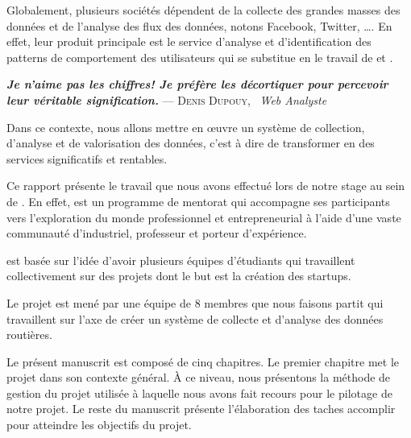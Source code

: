 Globalement, plusieurs sociétés dépendent de la collecte des grandes masses des
données et de l'analyse des flux des données, notons Facebook, Twitter, \ldots.
En effet, leur produit principale est le service d'analyse et d'identification
des patterns de comportement des utilisateurs qui se substitue en le travail de
 et .

\begin{center}
\textbf{\textit{Je n’aime pas les chiffres! Je préfère les décortiquer pour
percevoir leur véritable signification.}} \linebreak
\hfill --- \textsc{Denis Dupouy}, \ \textit{Web Analyste}
\end{center}

Dans ce contexte, nous allons mettre en \oe{}uvre un système de
collection, d'analyse et de valorisation des données, c'est à dire de transformer
en des services significatifs et rentables.

Ce rapport présente le travail que nous avons effectué lors de notre stage au
sein de . En effet,  est
un programme de mentorat qui accompagne ses participants vers l'exploration du monde
professionnel et entrepreneurial à l'aide d'une vaste communauté d'industriel,
professeur et porteur d'expérience.

 est basée sur l'idée d'avoir plusieurs équipes d'étudiants
qui travaillent collectivement sur des projets dont le but est la création des
startups.

Le projet  est mené par une équipe de 8 membres que nous faisons partit
qui travaillent sur l'axe de créer un système de collecte et d'analyse
des données routières.

Le présent manuscrit est composé de cinq chapitres. Le premier chapitre met le
projet dans son contexte général. À ce niveau, nous présentons la méthode de
gestion du projet utilisée à laquelle nous avons fait recours pour le pilotage
de notre projet. Le reste du manuscrit présente l'élaboration des taches
accomplir pour atteindre les objectifs du projet.
